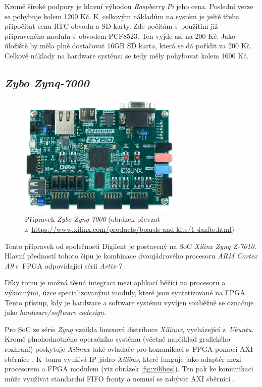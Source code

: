 Kromě široké podpory je hlavní výhodou \textit{Raspberry Pi} jeho cena. Poslední verze se pohybuje kolem 1200 Kč. K~celkovým nákladům na systém je ještě třeba připočítat cenu RTC obvodu a SD karty. Zde počítám s~použitím již připraveného modulu s~obvodem PCF8523. Ten vyjde asi na 200 Kč. Jako úložiště by měla plně dostačovat 16GB SD karta, která se dá pořídit za 200 Kč. Celkové náklady na hardware systému se tedy měly pohybovat kolem 1600 Kč.

\subsection{\textit{Zybo Zynq-7000}}
\label{sec:an_zyb}

\begin{figure}[h!]
    \centering
    \includegraphics[width=0.7\textwidth]{images/zybo.jpg}
    \caption[Přípravek \textit{Zybo Zynq-7000}]{Připravek \textit{Zybo Zynq-7000} (obrázek převzat z~\url{https://www.xilinx.com/products/boards-and-kits/1-4azfte.html})}
    \label{fig:zybo}
\end{figure}

Tento přípravek od společnosti Digilent je postavený na SoC \textit{Xilinx Zynq Z-7010}. Hlavní předností tohoto čipu je kombinace dvoujádrového procesoru \textit{ARM Cortex A9} s~FPGA odpovídající sérii \textit{Artix-7} \cite{zybo_man}. 

Díky tomu je možná těsná integraci mezi aplikací běžící na procesoru a výkonnými, úzce specializovanými moduly, které jsou syntetizované na FPGA. Tento přístup, kdy je hardware a software systému vyvíjen souběžně se označuje jako \textit{hardware/software codesign}.

Pro SoC ze série \textit{Zynq} vznikla linuxová distribuce \textit{Xilinux}, vycházející z~\textit{Ubuntu}. Kromě plnohodnotného operačního systému (včetně například grafického rozhraní) poskytuje \textit{Xilinux} také ovladače pro komunikaci s~FPGA pomocí AXI sběrnice \cite{xilibus}. K~tomu využívá IP jádro \textit{Xilibus}, které funguje jako adaptér mezi procesorem a FPGA modulem (viz obrázek \ref{fig:xilibus}). Ten pak ke komunikaci může využívat standardni FIFO fronty a nemusí se zabývat AXI sběrnicí \cite{xilibus}.

